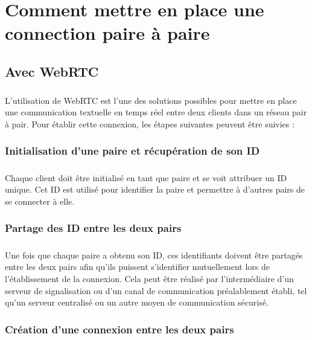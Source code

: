 \chapter{Comment mettre en place une connection paire à paire}

\section{Avec WebRTC}

\paragraph{}
L'utilisation de WebRTC est l'une des solutions possibles pour mettre en place une communication textuelle en temps réel entre deux clients dans un réseau pair à pair.
Pour établir cette connexion, les étapes suivantes peuvent être suivies :

\subsection{Initialisation d'une paire et récupération de son ID}

\paragraph{}
Chaque client doit être initialisé en tant que paire et se voit attribuer un ID unique. Cet ID est utilisé pour identifier la paire et permettre à d'autres pairs de se connecter à elle.

\subsection{Partage des ID entre les deux pairs}

\paragraph{}
Une fois que chaque paire a obtenu son ID, ces identifiants doivent être partagés entre les deux pairs afin qu'ils puissent s'identifier mutuellement lors de l'établissement de la connexion. 
Cela peut être réalisé par l'intermédiaire d'un serveur de signalisation ou d'un canal de communication préalablement établi, tel qu'un serveur centralisé ou un autre moyen de communication sécurisé.

\subsection{Création d'une connexion entre les deux pairs}

